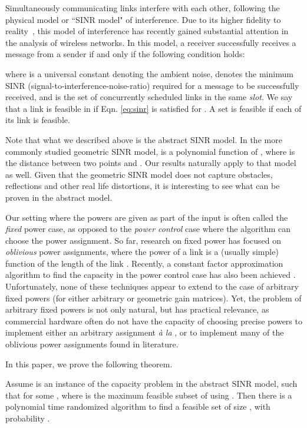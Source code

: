 \documentclass[11pt]{amsart}
\begin{document}
 Simultaneously communicating links interfere with each other,
following the  physical model or ``SINR model" of interference.
Due to its higher fidelity to reality~\cite{GronkMibiHoc01,MaheshwariJD08,Moscibroda2006Protocol},
this model of interference has recently gained substantial  attention in the analysis of wireless networks.
In this model, a receiver 
successfully receives a message from a sender  if and only if the
following condition holds:

where  is a universal constant denoting the ambient noise,  denotes the minimum
SINR (signal-to-interference-noise-ratio) required for a message to be successfully received,
and  is the set of concurrently scheduled links in the same \emph{slot}. We say that a link  is feasible in  if Eqn. \ref{eq:sinr} is satisfied for .
A set  is feasible if each of its link is feasible.  

Note that what we described above is the abstract SINR model.
In the more commonly studied geometric SINR model,  is a polynomial function of ,
where  is the distance between two points  and . Our results naturally apply to that model
as well. Given that the geometric SINR model does not capture obstacles, reflections and other real life distortions, 
it is interesting to see what can be proven in the abstract model.

Our setting where the powers are given as part of the input is often called the \emph{fixed} power case,
as opposed to the \emph{power control} case where the algorithm can choose the power assignment.
So far, research on fixed power
has focused on \emph{oblivious} power assignments, where the power
of a link is a (usually simple) function of the length of the link \cite{HW09,FKRV09,KV10,SODA11}.
Recently, a constant factor approximation algorithm to find the capacity in the power control case 
has also been achieved \cite{KesselheimSoda11}. Unfortunately, none 
of these techniques appear to extend to the case of arbitrary fixed powers (for either arbitrary or geometric gain matrices). Yet, the problem of arbitrary fixed powers
is not only natural, but has practical relevance, as commercial hardware often do not 
have the capacity of choosing precise powers to implement either an arbitrary assignment \emph{\`{a} la} \cite{KesselheimSoda11}, or to implement many of the oblivious power assignments found in literature.

In this paper, we prove the following theorem.
\begin{theorem}
Assume  is an instance of the capacity problem in the abstract SINR model, such that  for some , where  is the maximum feasible subset of  using . Then there is a polynomial time randomized algorithm to find a feasible set of size , with probability .
\label{mainth1}
\end{theorem}
\end{document}
